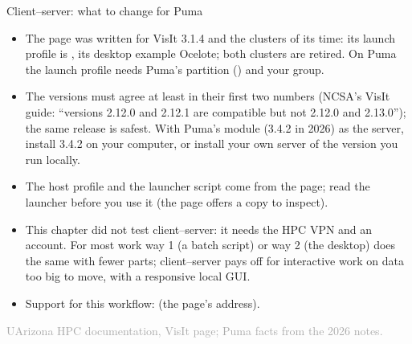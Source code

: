 \documentclass[aspectratio=169,11pt]{beamer}
\newcommand{\sourcecredit}[1]{\vfill\begin{flushright}\tiny\textcolor{DarkGray}{#1}\end{flushright}}
\begin{document}
\begin{frame}{Client--server: what to change for Puma}
\label{fr:cs2}
\footnotesize
\begin{itemize}\setlength{\itemsep}{1pt}
  \item The page was written for VisIt 3.1.4 and the clusters of its time: its launch profile is , its desktop example Ocelote; both clusters are retired. On Puma the launch profile needs Puma's partition () and your group.
  \item The versions must agree at least in their first two numbers (NCSA's VisIt guide: ``versions 2.12.0 and 2.12.1 are compatible but not 2.12.0 and 2.13.0''); the same release is safest. With Puma's module (3.4.2 in 2026) as the server, install 3.4.2 on your computer, or install your own server of the version you run locally.
  \item The host profile and the launcher script come from the page; read the launcher before you use it (the page offers a copy to inspect).
  \item This chapter did not test client--server: it needs the HPC VPN and an account. For most work way 1 (a batch script) or way 2 (the desktop) does the same with fewer parts; client--server pays off for interactive work on data too big to move, with a responsive local GUI.
  \item Support for this workflow:  (the page's address).
\end{itemize}
\sourcecredit{UArizona HPC documentation, VisIt page; Puma facts from the 2026 notes.}
\end{frame}
\end{document}
